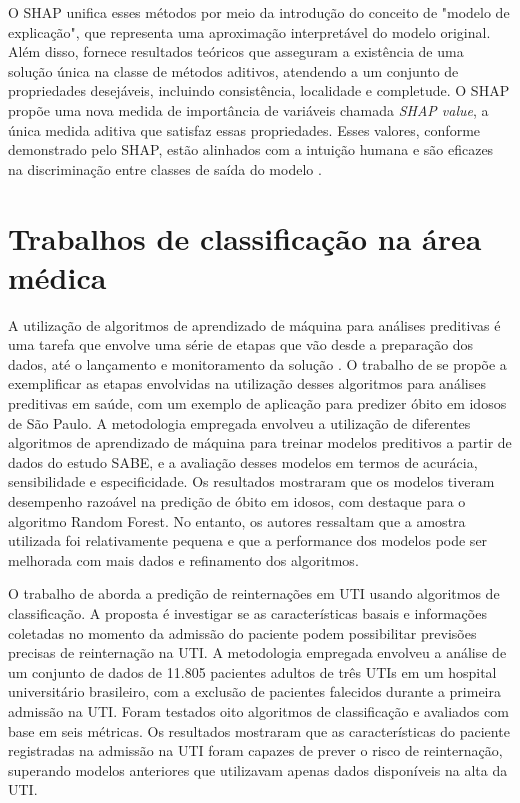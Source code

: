 O SHAP unifica esses métodos por meio da introdução do conceito de "modelo de explicação", que representa uma aproximação interpretável do modelo original. Além disso, fornece resultados teóricos que asseguram a existência de uma solução única na classe de métodos aditivos, atendendo a um conjunto de propriedades desejáveis, incluindo consistência, localidade e completude. O SHAP propõe uma nova medida de importância de variáveis chamada \textit{SHAP value}, a única medida aditiva que satisfaz essas propriedades. Esses valores, conforme demonstrado pelo SHAP, estão alinhados com a intuição humana e são eficazes na discriminação entre classes de saída do modelo \cite{Shap2017}.

\section{Trabalhos de classificação na área médica}\label{sec-context}

A utilização de algoritmos de aprendizado de máquina para análises preditivas é uma tarefa que envolve uma série de etapas que vão desde  a preparação dos dados, até o lançamento e monitoramento da solução \cite{geron2022hands}. O trabalho de  se propõe a exemplificar as etapas envolvidas na utilização desses algoritmos para análises preditivas em saúde, com um exemplo de aplicação para predizer óbito em idosos de São Paulo. A metodologia empregada envolveu a utilização de diferentes algoritmos de aprendizado de máquina para treinar modelos preditivos a partir de dados do estudo SABE, e a avaliação desses modelos em termos de acurácia, sensibilidade e especificidade. Os resultados mostraram que os modelos tiveram desempenho razoável na predição de óbito em idosos, com destaque para o algoritmo Random Forest. No entanto, os autores ressaltam que a amostra utilizada foi relativamente pequena e que a performance dos modelos pode ser melhorada com mais dados e refinamento dos algoritmos.

O trabalho de  aborda a predição de reinternações em UTI usando algoritmos de classificação. A proposta é investigar se as características basais e informações coletadas no momento da admissão do paciente podem possibilitar previsões precisas de reinternação na UTI. A metodologia empregada envolveu a análise de um conjunto de dados de 11.805 pacientes adultos de três UTIs em um hospital universitário brasileiro, com a exclusão de pacientes falecidos durante a primeira admissão na UTI. Foram testados oito algoritmos de classificação e avaliados com base em seis métricas. Os resultados mostraram que as características do paciente registradas na admissão na UTI foram capazes de prever o risco de reinternação, superando modelos anteriores que utilizavam apenas dados disponíveis na alta da UTI.

